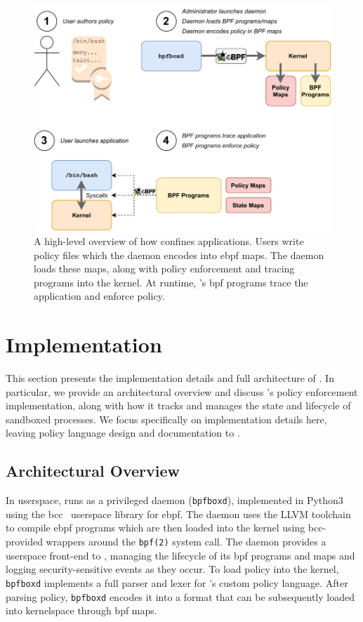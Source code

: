 \begin{figure}[htpb]
  \centering
  \includegraphics[width=0.8\linewidth]{figs/bpfbox/overview.pdf}
  \caption[A high-level overview of how \bpfbox{} confines applications]{
    A high-level overview of how \bpfbox{} confines applications. Users write policy files
    which the daemon encodes into \gls{ebpf} maps. The daemon loads these maps, along with
    policy enforcement and tracing programs into the kernel. At runtime, \bpfbox{}'s
    \gls{bpf} programs trace the application and enforce policy.
  }%
  \label{fig:bpfbox-policy-overview}
\end{figure}



\section{\bpfbox{} Implementation}%
\label{s:bpfbox-implementation}

This section presents the implementation details and full architecture of \bpfbox{}.  In
particular, we provide an architectural overview and discuss \bpfbox{}'s policy
enforcement implementation, along with how it tracks and manages the state and lifecycle
of sandboxed processes. We focus specifically on implementation details here, leaving
policy language design and documentation to .

\subsection{Architectural Overview}%
\label{ss:bpfbox-architecture}

In userspace, \bpfbox{} runs as a privileged daemon (\texttt{bpfboxd}), implemented in
Python3 using the bcc~\cite{bcc} userspace library for \gls{ebpf}. The daemon uses the
LLVM toolchain~\cite{llvm_bpf} to compile \gls{ebpf} programs which are then loaded into
the kernel using bcc-provided wrappers around the \texttt{bpf(2)} system call. The daemon
provides a userspace front-end to \bpfbox{}, managing the lifecycle of its \gls{bpf}
programs and maps and logging security-sensitive events as they occur. To load policy into
the kernel, \texttt{bpfboxd} implements a full parser and lexer for \bpfbox{}'s custom
policy language.  After parsing policy, \texttt{bpfboxd} encodes it into a format that can
be subsequently loaded into kernelspace through \gls{bpf} maps.

